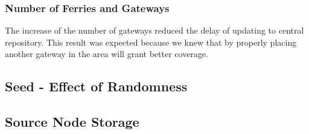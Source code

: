 \subsubsection{Number of Ferries and Gateways}
The increase of the number of gateways reduced the delay of updating to central repository.  
This result was expected because we knew that by properly placing another gateway in the area will grant better coverage.  
\subsection{Seed - Effect of Randomness}

\subsection{Source Node Storage}
